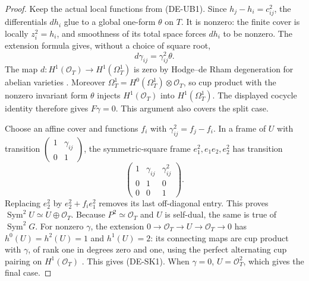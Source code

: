 \begin{proof}
Keep the actual local functions from (DE-UB1). Since
$h_j-h_i=c_{ij}^2$, the differentials $dh_i$ glue to a global one-form
$\theta$ on $T$. It is nonzero: the finite cover is locally
$z_i^2=h_i$, and smoothness of its total space forces $dh_i$ to be
nonzero. The extension formula gives, without a choice of square root,
\[
 d\gamma_{ij}=\gamma_{ij}^2\theta.
\]
The map $d:H^1(\mathcal O_T)\to H^1(\Omega_T^1)$ is zero by
Hodge--de Rham degeneration for abelian varieties
\cite[Corollary~7.29 and its full proof, pp.~108--109]
{EdixhovenVanDerGeerMoonenAV}.
Moreover $\Omega_T^1=H^0(\Omega_T^1)\otimes\mathcal O_T$, so cup
product with the nonzero invariant form $\theta$ injects
$H^1(\mathcal O_T)$ into $H^1(\Omega_T^1)$.
The displayed cocycle identity therefore gives $F\gamma=0$.
This argument also covers the split case.

Choose an affine cover and functions $f_i$ with
$\gamma_{ij}^2=f_j-f_i$. In a frame of $U$ with transition
$\left(\begin{smallmatrix}1&\gamma_{ij}\\0&1\end{smallmatrix}\right)$,
the symmetric-square frame $e_1^2,e_1e_2,e_2^2$ has transition
\[
 \begin{pmatrix}1&\gamma_{ij}&\gamma_{ij}^2\\0&1&0\\0&0&1\end{pmatrix}.
\]
Replacing $e_2^2$ by $e_2^2+f_i e_1^2$ removes its last off-diagonal
entry. This proves $\operatorname{Sym}^2U\simeq U\oplus\mathcal O_T$.
Because $P^2\simeq\mathcal O_T$ and $U$ is self-dual, the same is true
of $\operatorname{Sym}^2G$.
For nonzero $\gamma$, the extension $0\to\mathcal O_T\to U\to
\mathcal O_T\to0$ has $h^0(U)=h^2(U)=1$ and $h^1(U)=2$:
its connecting maps are cup product with $\gamma$, of rank one in
degrees zero and one, using the perfect alternating cup pairing on
$H^1(\mathcal O_T)$ \cite[Proposition~7.27, p.~108]
{EdixhovenVanDerGeerMoonenAV}. This gives (DE-SK1).
When $\gamma=0$, $U=\mathcal O_T^2$, which gives the final case.
\end{proof}

